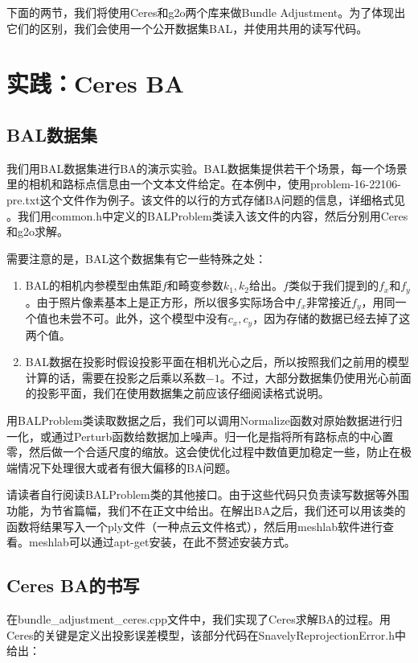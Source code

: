 下面的两节，我们将使用Ceres和g2o两个库来做Bundle Adjustment。为了体现出它们的区别，我们会使用一个公开数据集BAL\textsubscript{\cite{bundleadjustmentinlarge}}，并使用共用的读写代码。

\section{实践：Ceres BA}
\subsection{BAL数据集}
我们用BAL数据集进行BA的演示实验。BAL数据集提供若干个场景，每一个场景里的相机和路标点信息由一个文本文件给定。在本例中，使用problem-16-22106-pre.txt这个文件作为例子。该文件的以行的方式存储BA问题的信息，详细格式见 。我们用common.h中定义的BALProblem类读入该文件的内容，然后分别用Ceres和g2o求解。

需要注意的是，BAL这个数据集有它一些特殊之处：
\begin{enumerate}
\item BAL的相机内参模型由焦距$f$和畸变参数$k_1,k_2$给出。$f$类似于我们提到的$f_x$和$f_y$。由于照片像素基本上是正方形，所以很多实际场合中$f_x$非常接近$f_y$，用同一个值也未尝不可。此外，这个模型中没有$c_x,c_y$，因为存储的数据已经去掉了这两个值。
\item BAL数据在投影时假设投影平面在相机光心之后，所以按照我们之前用的模型计算的话，需要在投影之后乘以系数$-1$。不过，大部分数据集仍使用光心前面的投影平面，我们在使用数据集之前应该仔细阅读格式说明。
\end{enumerate}

用BALProblem类读取数据之后，我们可以调用Normalize函数对原始数据进行归一化，或通过Perturb函数给数据加上噪声。归一化是指将所有路标点的中心置零，然后做一个合适尺度的缩放。这会使优化过程中数值更加稳定一些，防止在极端情况下处理很大或者有很大偏移的BA问题。

请读者自行阅读BALProblem类的其他接口。由于这些代码只负责读写数据等外围功能，为节省篇幅，我们不在正文中给出。在解出BA之后，我们还可以用该类的函数将结果写入一个ply文件（一种点云文件格式），然后用meshlab软件进行查看。meshlab可以通过apt-get安装，在此不赘述安装方式。

\subsection{Ceres BA的书写}
在bundle\_adjustment\_ceres.cpp文件中，我们实现了Ceres求解BA的过程。用Ceres的关键是定义出投影误差模型，该部分代码在SnavelyReprojectionError.h中给出：

